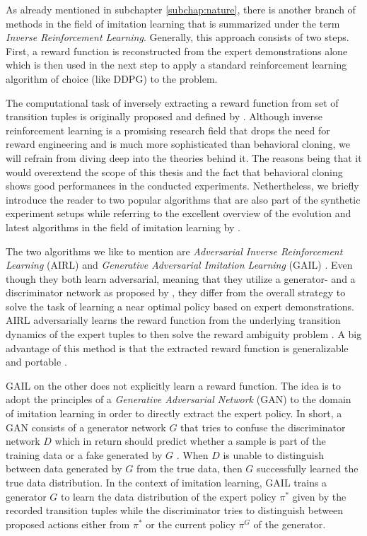 As already mentioned in subchapter \ref{subchap:nature}, there is another branch of methods in the field of imitation learning that is summarized under the term \textit{Inverse Reinforcement Learning}. Generally, this approach consists of two steps. First, a reward function is reconstructed from the expert demonstrations alone which is then used in the next step to apply a standard reinforcement learning algorithm of choice (like DDPG) to the problem.
\par
The computational task of inversely extracting a reward function from set of transition tuples is originally proposed and defined by \cite{russell1998learning}. Although inverse reinforcement learning is a promising research field that drops the need for reward engineering and is much more sophisticated than behavioral cloning, we will refrain from diving deep into the theories behind it. The reasons being that it would overextend the scope of this thesis and the fact that behavioral cloning shows good performances in the conducted experiments. Nethertheless, we briefly introduce the reader to two popular algorithms that are also part of the synthetic experiment setups while referring to the excellent overview of the evolution and latest algorithms in the field of imitation learning by \cite{zheng2021imitation}.
\par
The two algorithms we like to mention are  \textit{Adversarial Inverse Reinforcement Learning} (AIRL) \cite[]{fu2017learning} and \textit{Generative Adversarial Imitation Learning} (GAIL) \cite[]{ho2016generative}. Even though they both learn adversarial, meaning that they utilize a generator- and a discriminator network as proposed by \cite{goodfellow2014generative}, they differ from the overall strategy to solve the task of learning a near optimal policy based on expert demonstrations. AIRL adversarially learns the 
reward function from the underlying transition dynamics of the expert tuples to then solve the reward ambiguity problem \cite[pp.~4-5]{fu2017learning}. A big advantage of this method is that the extracted reward function is generalizable and portable \cite[p.~1735]{wang2020deep}.
\par
GAIL on the other does not explicitly learn a reward function. The idea is to adopt the principles of a \textit{Generative Adversarial Network} (GAN) to the domain of imitation learning in order to directly extract the expert policy. In short, a GAN consists of a generator network $G$ that tries to confuse the discriminator network $D$ which in return should predict whether a sample is part of the training data or a fake generated by $G$ \cite[p.~1]{goodfellow2014generative}. When $D$ is unable to distinguish between data generated by $G$ from the true data, then $G$ successfully learned the true data distribution. In the context of imitation learning, GAIL trains a generator $G$ to learn the data distribution of the expert policy $\pi^*$ given by the recorded transition tuples while the discriminator tries to distinguish between proposed actions either from $\pi^*$ or the current policy $\pi^G$ of the generator.
